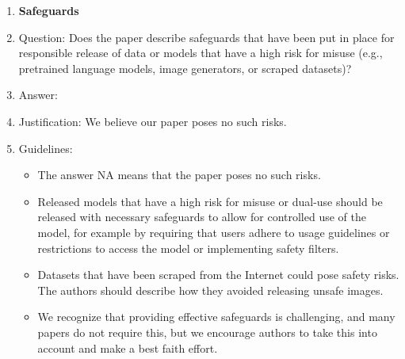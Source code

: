 \documentclass{article}
\theoremstyle{remark}
\begin{document}
\begin{enumerate}
\item {\bf Safeguards}
    \item[] Question: Does the paper describe safeguards that have been put in place for responsible release of data or models that have a high risk for misuse (e.g., pretrained language models, image generators, or scraped datasets)?
    \item[] Answer: \answerNA{} %
    \item[] Justification: We believe our paper poses no such risks.
    \item[] Guidelines:
    \begin{itemize}
        \item The answer NA means that the paper poses no such risks.
        \item Released models that have a high risk for misuse or dual-use should be released with necessary safeguards to allow for controlled use of the model, for example by requiring that users adhere to usage guidelines or restrictions to access the model or implementing safety filters. 
        \item Datasets that have been scraped from the Internet could pose safety risks. The authors should describe how they avoided releasing unsafe images.
        \item We recognize that providing effective safeguards is challenging, and many papers do not require this, but we encourage authors to take this into account and make a best faith effort.
    \end{itemize}


\end{enumerate}
\end{document}
